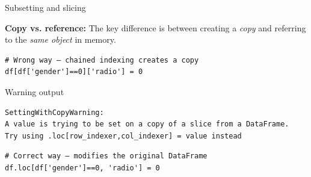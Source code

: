 \begin{frame}[fragile]{Subsetting and slicing}

\textbf{Copy vs. reference:}  
The key difference is between creating a \textit{copy} and referring to the \textit{same object} in memory.

\begin{verbatim}
# Wrong way — chained indexing creates a copy
df[df['gender']==0]['radio'] = 0
\end{verbatim}

\begin{block}{Warning output}
\begin{verbatim}
SettingWithCopyWarning:
A value is trying to be set on a copy of a slice from a DataFrame.
Try using .loc[row_indexer,col_indexer] = value instead
\end{verbatim}
\end{block}

\begin{verbatim}
# Correct way — modifies the original DataFrame
df.loc[df['gender']==0, 'radio'] = 0
\end{verbatim}

\end{frame}









